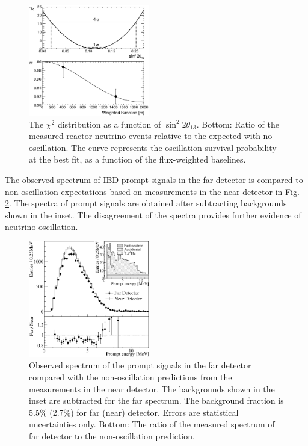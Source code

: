 \documentclass[aps,prl,twocolumn,superscriptaddress,showpacs]{revtex4-1}
\begin{document}
\begin{figure}[hbt]
\begin{center}
\includegraphics[width=0.47\textwidth]{chi-square.eps}
\caption{The $\chi^2$ distribution as a function of $\sin^2 2\theta_{13}$. Bottom: Ratio of the measured reactor neutrino events relative to the expected with no oscillation. The curve represents the oscillation survival probability at the best fit, as a function of the flux-weighted baselines.}
\label{fig:chi-square}
\end{center}
\end{figure}


The observed spectrum of IBD prompt signals in the far detector is compared to non-oscillation expectations based on measurements in the near detector in Fig. \ref{fig:prompt-spectra}.
The spectra of prompt signals are obtained after subtracting backgrounds  shown in the inset.
The disagreement of the spectra provides further evidence of neutrino oscillation. 

\begin{figure}[hbt]
\begin{center}
\includegraphics[width=0.47\textwidth]{prompt-spectra.eps}
\caption{Observed spectrum of the prompt signals in the far detector compared with the non-oscillation predictions from the measurements in the near detector. The backgrounds shown in the inset are subtracted for the far spectrum. The background fraction is 5.5\% (2.7\%) for far (near) detector. Errors are statistical uncertainties only. Bottom: The ratio of the measured spectrum of far detector to the non-oscillation prediction.}
\label{fig:prompt-spectra}
\end{center}
\end{figure}
\end{document}
